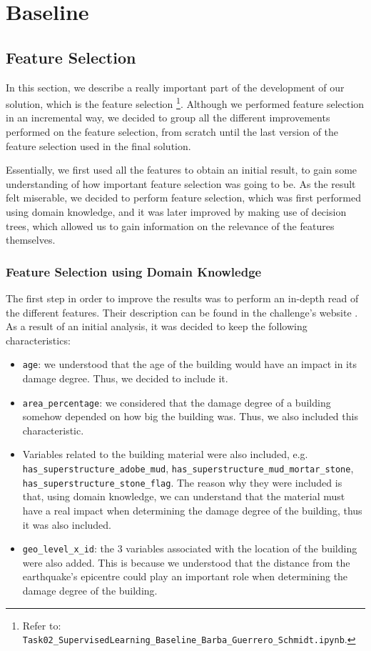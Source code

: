 \section{Baseline}
\label{CHAPTER_BaselineDev}

\subsection{Feature Selection}
\label{SUBSECTION_FeatureSelection}
In this section, we describe a really important part of the development of our solution, which is the feature selection \footnote{Refer to: \texttt{Task02\_SupervisedLearning\_Baseline\_Barba\_Guerrero\_Schmidt.ipynb}.}. Although we performed feature selection in an incremental way, we decided to group all the different improvements performed on the feature selection, from scratch until the last version of the feature selection used in the final solution.

Essentially, we first used all the features to obtain an initial result, to gain some understanding of how important feature selection was going to be. As the result felt miserable, we decided to perform feature selection, which was first performed using domain knowledge, and it was later improved by making use of decision trees, which allowed us to gain information on the relevance of the features themselves.


\subsubsection{Feature Selection using Domain Knowledge}
\label{SUBSUBSECTION_FeatureSelectionDomainKnowledge}
The first step in order to improve the results was to perform an in-depth read of the different features. Their description can be found in the challenge’s website \cite{DrivenData22}. As a result of an initial analysis, it was decided to keep the following characteristics:
\begin{itemize}
    \item \texttt{age}: we understood that the age of the building would have an impact in its damage degree. Thus, we decided to include it.
    \item  \texttt{area\_percentage}: we considered that the damage degree of a building somehow depended on how big the building was. Thus, we also included this characteristic.
    \item Variables related to the building material were also included, e.g. \texttt{has\_superstructure\_adobe\_mud}, \texttt{has\_superstructure\_mud\_mortar\_stone}, \texttt{has\_superstructure\_stone\_flag}. The reason why they were included is that, using domain knowledge, we can understand that the material must have a real impact when determining the damage degree of the building, thus it was also included.
    \item \texttt{geo\_level\_x\_id}: the 3 variables associated with the location of the building were also added. This is because we understood that the distance from the earthquake’s epicentre could play an important role when determining the damage degree of the building.
\end{itemize}

